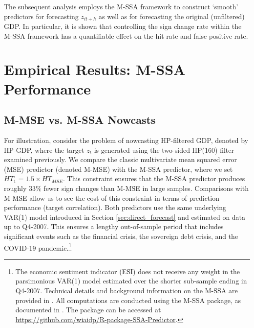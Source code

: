 \documentclass[11pt,a4paper]{article}
\begin{document}
The subsequent analysis employs the M-SSA framework to construct `smooth' predictors for forecasting $z_{it+h}$ as well as for forecasting the original (unfiltered) GDP. In particular, it is shown that controlling the sign change rate within the M-SSA framework has a quantifiable effect on the hit rate and false positive rate.

 
\section{Empirical Results: M-SSA Performance\label{sec:performance_mssa}}

\subsection{M-MSE vs. M-SSA Nowcasts}
For illustration, consider the problem of nowcasting HP-filtered GDP, denoted by HP-GDP, where the target $z_t$ is generated using the two-sided HP(160) filter examined previously. We compare the classic multivariate mean squared error (MSE) predictor (denoted M-MSE) with the M-SSA predictor, where we set $HT_1=1.5\times HT_{MSE}$. This constraint ensures that the M-SSA predictor produces roughly 33$\%$ fewer sign changes than M-MSE in large samples. Comparisons with M-MSE allow us to see the cost of this constraint in terms of prediction performance (target correlation). 
Both predictors use the same underlying VAR(1) model introduced in Section \ref{sec:direct_forecast} and estimated on data up to Q4-2007. This ensures a lengthy out-of-sample period that includes significant events such as the financial crisis, the sovereign debt crisis, and the COVID-19 pandemic.\footnote{The economic sentiment indicator (ESI) does not receive any weight in the parsimonious VAR(1) model estimated over the shorter sub-sample ending in Q4-2007. Technical details and background information on the M-SSA are provided in \cite{Wildi2025}. All computations are conducted using the M-SSA package, as documented in \cite{Wildi2025}. The package can be accessed at \url{https://github.com/wiaidp/R-package-SSA-Predictor}.}
\end{document}
